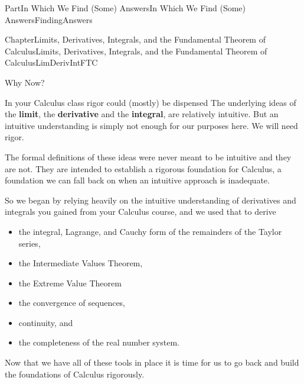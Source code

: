 \documentclass[oneside,10pt,]{book}
\newcommand{\terminology}[1]{\textbf{#1}}
\numberwithin{equation}{part}
\begin{document}
\begin{partptx}{Part}{In Which We Find (Some) Answers}{}{In Which We Find (Some) Answers}{}{}{FindingAnswers}
\begin{chapterptx}{Chapter}{Limits, Derivatives, Integrals, and the Fundamental Theorem of Calculus}{}{Limits, Derivatives, Integrals, and the Fundamental Theorem of Calculus}{}{}{LimDerivIntFTC}
\begin{introduction}{Why Now?}
\par
In your Calculus class rigor could (mostly) be dispensed The underlying ideas of the \terminology{limit}, the \terminology{derivative} and the \terminology{integral}, are relatively intuitive. But an intuitive understanding is simply not enough for our purposes here. We will need rigor.%
\par
The formal definitions of these ideas were never meant to be intuitive and they are not. They are intended to establish a rigorous foundation for Calculus, a foundation we can fall back on when an intuitive approach is inadequate.%
\par
So we began by relying heavily on the intuitive understanding of derivatives and integrals you gained from your Calculus course, and we used that to derive%
\begin{itemize}[label=\textbullet]
\item{}the integral, Lagrange, and Cauchy form of the remainders of the Taylor series,%
\item{}the Intermediate Values Theorem,%
\item{}the Extreme Value Theorem%
\item{}the convergence of sequences,%
\item{}continuity, and%
\item{}the completeness of the real number system.%
\end{itemize}
Now that we have all of these tools in place it is time for us to go back and build the  foundations of Calculus rigorously.%
\end{introduction}%
%
%
\typeout{************************************************}
\typeout{************************************************}
%
\end{chapterptx}
\end{partptx}
\end{document}

